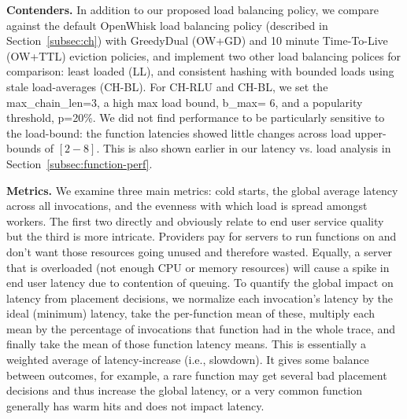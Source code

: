 \noindent \textbf{Contenders.}
In addition to our proposed load balancing policy, we compare against the default OpenWhisk load balancing policy (described in Section~\ref{subsec:ch}) with GreedyDual (OW+GD) and 10 minute Time-To-Live (OW+TTL) eviction policies, and implement two other load balancing polices for comparison: least loaded (LL), and consistent hashing with bounded loads using stale load-averages (CH-BL). 
For CH-RLU and CH-BL, we set the max\_chain\_len=3, a high max load bound, b\_max= 6, and a popularity threshold, p=20\%. 
We did not find performance to be particularly sensitive to the load-bound: the function latencies showed little changes across load upper-bounds of $[2-8]$. 
This is also shown earlier in our latency vs. load analysis in Section~\ref{subsec:function-perf}. 




\noindent \textbf{Metrics.}
We examine three main metrics: cold starts, the global average latency across all invocations, and the evenness with which load is spread amongst workers.
%
The first two directly and obviously relate to end user service quality but the third is more intricate. 
Providers pay for servers to run functions on and don't want those resources going unused and therefore wasted.
Equally, a server that is overloaded (not enough CPU or memory resources) will cause a spike in end user latency due to contention of queuing.
%
To quantify the global impact on latency from placement decisions, we normalize each invocation's latency by the ideal (minimum) latency, take the per-function mean of these, multiply each mean by the percentage of invocations that function had in the whole trace, and finally take the mean of those function latency means.
This is essentially a weighted average of latency-increase (i.e., slowdown).
It gives some balance between outcomes, for example, a rare function may get several bad placement decisions and thus increase the global latency, or a very common function generally has warm hits and does not impact latency. 



